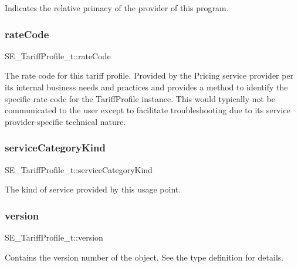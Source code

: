 Indicates the relative primacy of the provider of this program. \mbox{\label{group__TariffProfile_gac8e09cc332d01b111d36845abc32972e}} 
\subsubsection{\texorpdfstring{rate\+Code}{rateCode}}
{\footnotesize\ttfamily S\+E\+\_\+\+Tariff\+Profile\+\_\+t\+::rate\+Code}

The rate code for this tariff profile. Provided by the Pricing service provider per its internal business needs and practices and provides a method to identify the specific rate code for the Tariff\+Profile instance. This would typically not be communicated to the user except to facilitate troubleshooting due to its service provider-\/specific technical nature. \mbox{\label{group__TariffProfile_ga0a246c8cd1bc935177a2bf6aca7a328a}} 
\subsubsection{\texorpdfstring{service\+Category\+Kind}{serviceCategoryKind}}
{\footnotesize\ttfamily S\+E\+\_\+\+Tariff\+Profile\+\_\+t\+::service\+Category\+Kind}

The kind of service provided by this usage point. \mbox{\label{group__TariffProfile_ga40737bc54b06a6865e6f15c4314fa4f8}} 
\subsubsection{\texorpdfstring{version}{version}}
{\footnotesize\ttfamily S\+E\+\_\+\+Tariff\+Profile\+\_\+t\+::version}

Contains the version number of the object. See the type definition for details. 